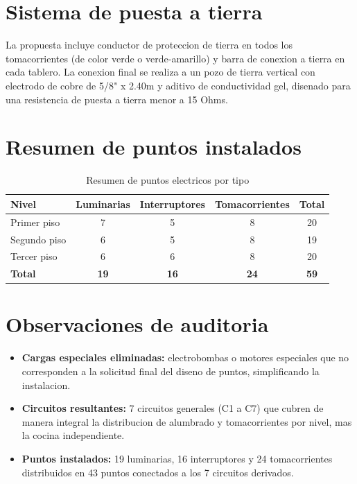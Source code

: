 \section{Sistema de puesta a tierra}

La propuesta incluye conductor de proteccion de tierra en todos los tomacorrientes (de color verde o verde-amarillo) y barra de conexion a tierra en cada tablero. La conexion final se realiza a un pozo de tierra vertical con electrodo de cobre de 5/8" x 2.40m y aditivo de conductividad gel, disenado para una resistencia de puesta a tierra menor a 15 Ohms.

\section{Resumen de puntos instalados}

\begin{table}[H]
\centering
\small
\caption{Resumen de puntos electricos por tipo}
\label{tab:resumen-puntos}
\begin{tabularx}{\textwidth}{L{3.5cm} c c c c}
\toprule
\textbf{Nivel} & \textbf{Luminarias} & \textbf{Interruptores} & \textbf{Tomacorrientes} & \textbf{Total} \\
\midrule
Primer piso & 7 & 5 & 8 & 20 \\
Segundo piso & 6 & 5 & 8 & 19 \\
Tercer piso & 6 & 6 & 8 & 20 \\
\midrule
\textbf{Total} & \textbf{19} & \textbf{16} & \textbf{24} & \textbf{59} \\
\bottomrule
\end{tabularx}
\end{table}

\section{Observaciones de auditoria}

\begin{itemize}
  \item \textbf{Cargas especiales eliminadas:} electrobombas o motores especiales que no corresponden a la solicitud final del diseno de puntos, simplificando la instalacion.
  \item \textbf{Circuitos resultantes:} 7 circuitos generales (C1 a C7) que cubren de manera integral la distribucion de alumbrado y tomacorrientes por nivel, mas la cocina independiente.
  \item \textbf{Puntos instalados:} 19 luminarias, 16 interruptores y 24 tomacorrientes distribuidos en 43 puntos conectados a los 7 circuitos derivados.
\end{itemize}
